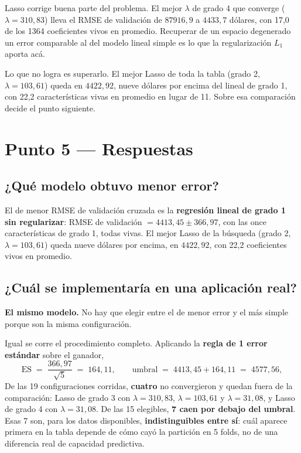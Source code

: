 \documentclass[11pt,a4paper]{article}
\newcommand{\destacado}[1]{\textcolor{azulserie}{\textbf{#1}}}
\begin{document}
Lasso corrige buena parte del problema. El mejor $\lambda$ de grado 4 que converge
($\lambda = 310{,}83$) lleva el RMSE de validación de $87916{,}9$ a $4433{,}7$ dólares, con
17,0 de los 1364 coeficientes vivos en promedio. Recuperar de un espacio degenerado un error
comparable al del modelo lineal simple es lo que la regularización $L_1$ aporta acá.

Lo que no logra es superarlo. El mejor Lasso de toda la tabla (grado 2, $\lambda = 103{,}61$)
queda en $4422{,}92$, nueve dólares por encima del lineal de grado 1, con 22,2 características
vivas en promedio en lugar de 11. Sobre esa comparación decide el punto siguiente.

\section{Punto 5 --- Respuestas}

\subsection{¿Qué modelo obtuvo menor error?}

El de menor RMSE de validación cruzada es la \textbf{regresión lineal de grado 1 sin
regularizar}: RMSE de validación $= 4413{,}45 \pm 366{,}97$, con las once características de
grado 1, todas vivas. El mejor Lasso de la búsqueda (grado 2, $\lambda = 103{,}61$) queda nueve
dólares por encima, en $4422{,}92$, con 22,2 coeficientes vivos en promedio.

\subsection{¿Cuál se implementaría en una aplicación real?}

\textbf{El mismo modelo.} No hay que elegir entre el de menor error y el más simple porque son
la misma configuración.

Igual se corre el procedimiento completo. Aplicando la \textbf{regla de 1 error estándar} sobre
el ganador,
\begin{equation}
\mathrm{ES} \;=\; \frac{366{,}97}{\sqrt{5}} \;=\; 164{,}11 ,
\qquad
\text{umbral} \;=\; 4413{,}45 + 164{,}11 \;=\; 4577{,}56 ,
\end{equation}
De las 19 configuraciones corridas, \textbf{cuatro} no convergieron y quedan fuera de la
comparación: Lasso de grado 3 con $\lambda = 310{,}83$, $\lambda = 103{,}61$ y
$\lambda = 31{,}08$, y Lasso de grado 4 con $\lambda = 31{,}08$. De las 15 elegibles,
\destacado{7 caen por debajo del umbral}. Esas 7 son, para los datos disponibles,
\textbf{indistinguibles entre sí}: cuál aparece primera en la tabla depende de cómo cayó la
partición en 5 folds, no de una diferencia real de capacidad predictiva.
\end{document}
